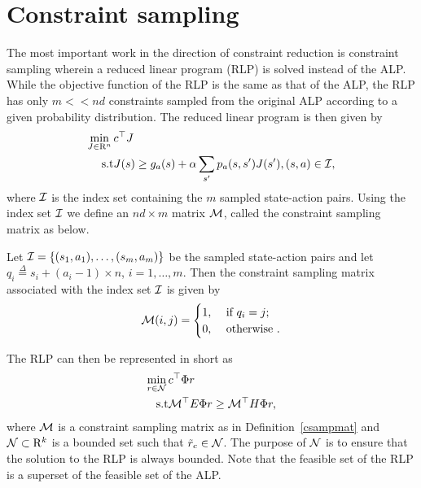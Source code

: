 \section{Constraint sampling}
The most important work in the direction of constraint reduction is constraint sampling \cite{CS} wherein a reduced linear program (RLP) is solved instead of the ALP. While the objective function of the RLP is the same as that of the ALP, the RLP has only $m<<nd$ constraints sampled from the original ALP according to a given probability distribution. The reduced linear program is then given by
\begin{align}\label{rlp}
\begin{split}
\min_{J\in \R^n}\, &c^\top J\\
\text{s.t}\mb &J(s)\geq g_a(s)+\alpha\sum_{s'}p_a(s,s')J(s'), \mb (s,a) \in \I,
\end{split}
\end{align}
where $\mathcal{I}$ is the index set containing the $m$ sampled state-action pairs. Using the index set $\mathcal{I}$ we define an $nd\times m$ matrix $\mathcal{M}$, called the constraint sampling matrix as below.
\begin{definition}\label{csampmat}
Let $\mathcal{I}=\{(s_1,a_1),\ldots,(s_m,a_m)\}$ be the sampled state-action pairs and let $q_i\stackrel{\Delta}{=}s_i+(a_i-1)\times n$, $i=1,\ldots,m$. Then the constraint sampling matrix associated with the index set $\mathcal{I}$ is given by
\begin{align}
\mathcal{M}(i,j)
=
\begin{cases}
1, & \text{ if } q_i = j;\\
0, & \text{ otherwise }.
\end{cases}
\end{align}
\end{definition}
The RLP can then be represented in short as
\begin{align}\label{rlpshort}
\begin{split}
\min_{r\in \N}\, &c^\top \Phi r\\
\text{s.t}\mb & \M^\top E \Phi r \geq \M^\top H \Phi r,
\end{split}
\end{align}
where $\mathcal{M}$ is a constraint sampling matrix as in Definition~\ref{csampmat} and $\mathcal{N}\subset \mathrm{R}^k$ is a bounded set such that $\tilde{r}_c \in \mathcal{N}$. The purpose of $\mathcal{N}$ is to ensure that the solution to the RLP is always bounded. Note that the feasible set of the RLP is a superset of the feasible set of the ALP.\\
